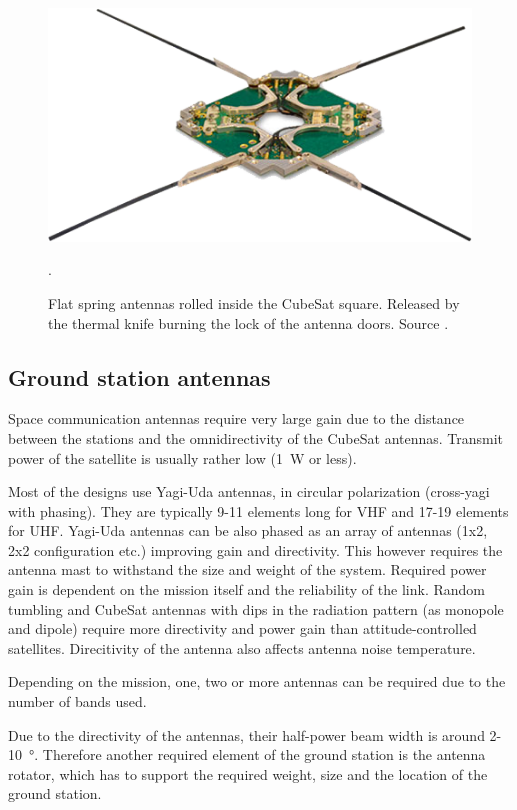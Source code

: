 \begin{figure}[H]
    \centering
    \includegraphics[width=0.5\paperwidth]{img/2/isis_dipole.png}
    \caption{Flat spring antennas rolled inside the CubeSat square. Released by the thermal knife burning the lock of the antenna doors. Source \cite{isis_dipole_antenna}.}.
    \label{isis_dipole_antenna}
\end{figure}

\subsection{Ground station antennas}
Space communication antennas require very large gain due to the distance between the stations and the omnidirectivity of the CubeSat antennas. Transmit power of the satellite is usually rather low (\SI{1}{\watt} or less).

Most of the designs use Yagi-Uda antennas, in circular polarization (cross-yagi with phasing). They are typically 9-11 elements long for VHF and 17-19 elements for UHF. Yagi-Uda antennas can be also phased as an array of antennas (1x2, 2x2 configuration etc.) improving gain and directivity. This however requires the antenna mast to withstand the size and weight of the system. Required power gain is dependent on the mission itself and the reliability of the link. Random tumbling and CubeSat antennas with dips in the radiation pattern (as monopole and dipole) require more directivity and power gain than attitude-controlled satellites. Direcitivity of the antenna also affects antenna noise temperature.

Depending on the mission, one, two or more antennas can be required due to the number of bands used. 

Due to the directivity of the antennas, their half-power beam width is around \si{2}-\SI{10}{\degree}. Therefore another required element of the ground station is the antenna rotator, which has to support the required weight, size and the location of the ground station.

